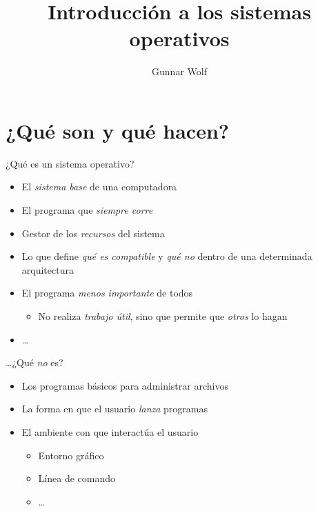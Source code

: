 \documentclass[presentation]{beamer}
\author{Gunnar Wolf}
\date{}
\title{Introducción a los sistemas operativos}
\begin{document}
\maketitle

\section{¿Qué son y qué hacen?}
\label{sec:orgf37f9c8}

\begin{frame}[label={sec:orgf0abfe9}]{¿Qué es un sistema operativo?}
\begin{itemize}
\item El \emph{sistema base} de una computadora \pause
\item El programa que \emph{siempre corre} \pause
\item Gestor de los \emph{recursos} del sistema \pause
\item Lo que define \emph{qué es compatible} y \emph{qué no} dentro de una
determinada arquitectura \pause
\item El programa \emph{menos importante} de todos \pause
\begin{itemize}
\item No realiza \emph{trabajo útil}, sino que permite que \emph{otros} lo hagan
\end{itemize}
\item …
\end{itemize}
\end{frame}

\begin{frame}[label={sec:orgbdc3bdb}]{…¿Qué \emph{no} es?}
\begin{itemize}
\item Los programas básicos para administrar archivos
\item La forma en que el usuario \emph{lanza} programas
\item El ambiente con que interactúa el usuario
\begin{itemize}
\item Entorno gráfico
\item Línea de comando
\item …
\end{itemize}
\end{itemize}
\end{frame}
\end{document}
